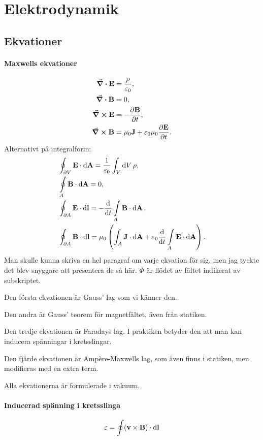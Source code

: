 \section{Elektrodynamik}

\subsection{Ekvationer}

\paragraph{Maxwells ekvationer}
\begin{align*}
	\div{\vect{E}}  &= \frac{\rho}{\varepsilon_0}, \\
	\div{\vect{B}}  &= 0, \\
	\curl{\vect{E}} &= -\pdv{\vect{B}}{t}, \\
	\curl{\vect{B}} &= \mu_0\vect{J} + \varepsilon_0\mu_0\pdv{\vect{E}}{t}.
\end{align*}
Alternativt på integralform:
\begin{align*}
	&\oint_{\partial V}\vect{E}\cdot\dd{\vect{A}} = \frac{1}{\varepsilon_0}\int_{V}\dd{V}\rho, \\
	&\oint\limits_{A}\vect{B}\cdot\dd{\vect{A}} = 0, \\
	&\oint_{\partial A}\vect{E}\cdot\dd{\vect{l}} = -\dv{t}\int\limits_{A}\vect{B}\cdot\dd{\vect{A}}, \\
	&\oint_{\partial A}\vect{B}\cdot\dd{\vect{l}} = \mu_0\left(\int_{A}\vect{J}\cdot\dd{\vect{A}} + \varepsilon_0\dv{t}\int\limits_{A}\vect{E}\cdot\dd{\vect{A}}\right).
\end{align*}
Man skulle kunna skriva en hel paragraf om varje ekvation för sig, men jag tyckte det blev snyggare att presentera de så här. $\Phi$ är flödet av fältet indikerat av subskriptet.

Den första ekvationen är Gauss' lag som vi känner den.

Den andra är Gauss' teorem för magnetfältet, även från statiken.

Den tredje ekvationen är Faradays lag. I praktiken betyder den att man kan inducera spänningar i kretsslingar.

Den fjärde ekvationen är Ampère-Maxwells lag, som även finns i statiken, men modifieras med en extra term.

Alla ekvationerna är formulerade i vakuum.

\paragraph{Inducerad spänning i kretsslinga}
\begin{align*}
	\varepsilon = \oint(\vect{v}\times\vect{B})\cdot\dd{\vect{l}}
\end{align*}

